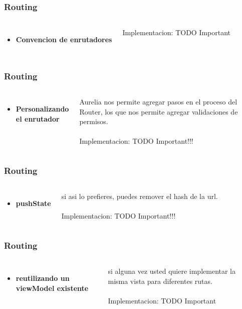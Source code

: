 \documentclass{beamer}
\begin{document}
\begin{frame}
\frametitle{Routing}
\begin{columns}[c]
\begin{itemize}
\item \textbf{Convencion de enrutadores}
\end{itemize}
Implementacion: TODO Important
\end{columns}
\end{frame}
\begin{frame}
\frametitle{Routing}
\begin{columns}[c]
\begin{itemize}
\item \textbf{Personalizando el enrutador}
\end{itemize}

Aurelia nos permite agregar pasos en el proceso del Router, los que nos permite agregar validaciones de permisos.
\\~\\
Implementacion: TODO Important!!!
\end{columns}
\end{frame}
\begin{frame}
\frametitle{Routing}
\begin{columns}[c]
\begin{itemize}
\item \textbf{pushState}
\end{itemize}

si asi lo prefieres, puedes remover el hash de la url.
\\~\\
Implementacion: TODO Important!!!
\end{columns}
\end{frame}
\begin{frame}
\frametitle{Routing}
\begin{columns}[c]
\begin{itemize}
\item \textbf{reutilizando un viewModel existente}
\end{itemize}

si alguna vez usted quiere implementar la misma vista para diferentes rutas.
\\~\\
Implementacion: TODO Important
\end{columns}
\end{frame}
\end{document}
